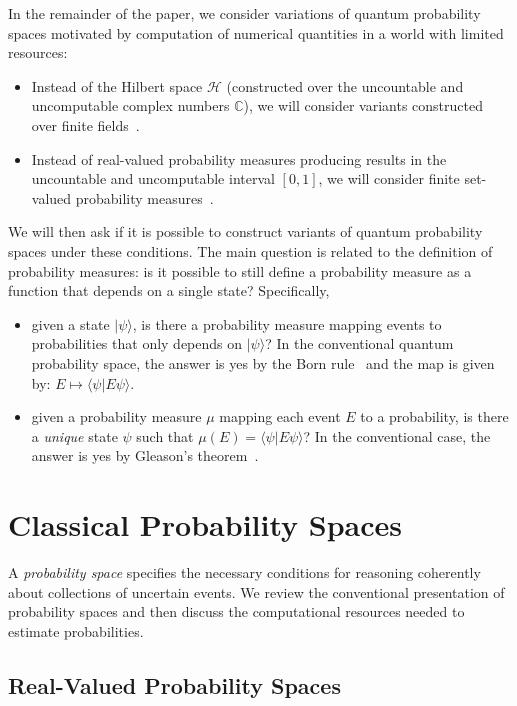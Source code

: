 \documentclass{article}
\theoremstyle{remark}
\newcommand{\Hilb}{\mathcal{H}}
\newcommand{\ket}[1]{|#1\rangle}
\newcommand{\ip}[2]{\langle #1 | #2 \rangle}
\begin{document}
In the remainder of the paper, we consider variations of quantum
probability spaces motivated by computation of numerical quantities in
a world with limited resources:
\begin{itemize}
\item Instead of the Hilbert space $\Hilb$ (constructed over the
  uncountable and uncomputable complex numbers $\mathbb{C}$), we will
  consider variants constructed over finite
  fields~\cite{HansonOrtizSabryEtAl2015,DQT2014,geometry2013}.
\item Instead of real-valued probability measures producing results in
  the uncountable and uncomputable interval $[0,1]$, we will consider
  finite set-valued probability measures~\cite{Artstein1972,PuriRalescu1983}.
\end{itemize}
We will then ask if it is possible to construct variants of quantum
probability spaces under these conditions. The main question is
related to the definition of probability measures: is it possible to
still define a probability measure as a function that depends on a
single state? Specifically,
\begin{itemize}
\item given a state $\ket{\psi}$, is there a probability measure
  mapping events to probabilities that only depends on $\ket{\psi}$?
  In the conventional quantum probability space, the answer is yes by
  the Born rule~\cite{Born1983,Mermin2007} and the map is given by:
  $E \mapsto \ip{\psi}{E\psi}$.
\item given a probability measure $\mu$
  mapping each event $E$
  to a probability, is there a \emph{unique} state $\psi$
  such that $\mu(E)
  =
  \ip{\psi}{E\psi}$? In the conventional case, the answer is yes by
  Gleason's
  theorem~\cite{gleason1957,peres1995quantum,Redhead1987-REDINA}.
\end{itemize}

\section{Classical Probability Spaces}
  
A \emph{probability space} specifies the necessary conditions for
reasoning coherently about collections of uncertain events.  We review
the conventional presentation of probability spaces and then discuss
the computational resources needed to estimate probabilities.

\subsection{Real-Valued Probability Spaces}
\end{document}
